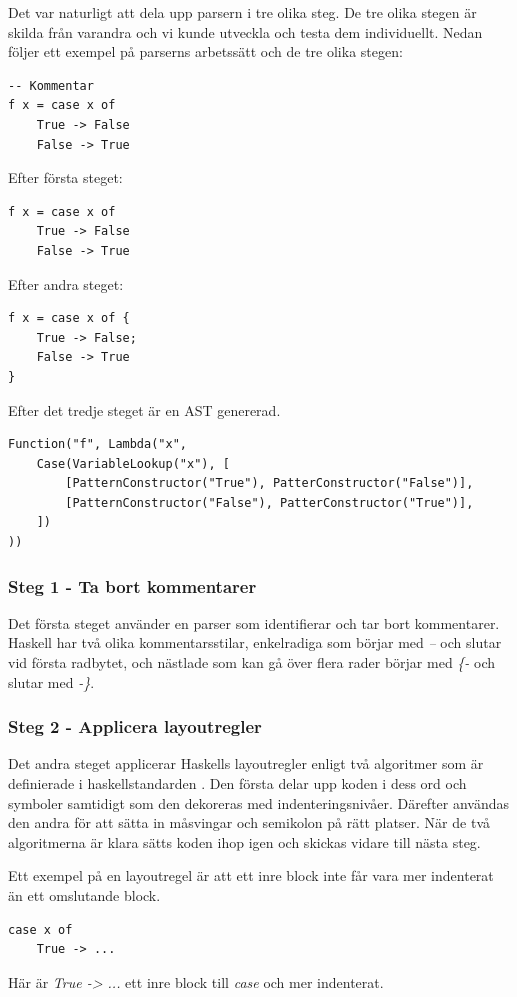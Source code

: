 Det var naturligt att dela upp parsern i tre olika steg. De tre olika stegen är skilda från varandra och vi kunde utveckla och testa dem individuellt.
Nedan följer ett exempel på parserns arbetssätt och de tre olika stegen:
\begin{lstlisting}
-- Kommentar
f x = case x of
    True -> False
    False -> True
\end{lstlisting}

Efter första steget:
\begin{lstlisting}
f x = case x of
    True -> False
    False -> True
\end{lstlisting}

Efter andra steget:
\begin{lstlisting}
f x = case x of {
    True -> False;
    False -> True
}
\end{lstlisting}

Efter det tredje steget är en AST genererad.
\begin{lstlisting}
Function("f", Lambda("x", 
    Case(VariableLookup("x"), [
        [PatternConstructor("True"), PatterConstructor("False")],
        [PatternConstructor("False"), PatterConstructor("True")],
    ])
))
\end{lstlisting}

\subsubsection{Steg 1 - Ta bort kommentarer}
Det första steget använder en parser som identifierar och tar bort kommentarer. 
Haskell har två olika kommentarsstilar, enkelradiga som börjar med \emph{--} och slutar vid första radbytet, och 
nästlade som kan gå över flera rader börjar med \emph{\{-} och slutar med \emph{-\}}.

\subsubsection{Steg 2 - Applicera layoutregler}
Det andra steget applicerar Haskells layoutregler enligt två algoritmer som är definierade i haskellstandarden \citep{haskell98chap9}. Den första delar upp koden i dess ord och symboler samtidigt som den dekoreras med indenteringsnivåer. 
Därefter användas den andra för att sätta in måsvingar och semikolon på rätt platser.
När de två algoritmerna är klara sätts koden ihop igen och skickas vidare till nästa steg.

Ett exempel på en layoutregel är att ett inre block inte får vara mer indenterat än ett omslutande block.
\begin{lstlisting}
case x of
    True -> ...
\end{lstlisting}
Här är \emph{True -> ...} ett inre block till \emph{case} och mer indenterat.

